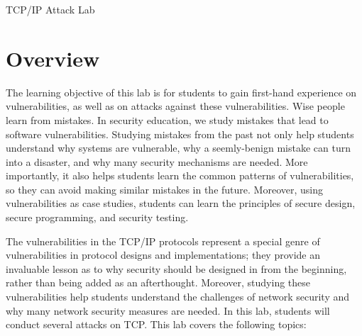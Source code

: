 




\newcommand{\telnet} {\texttt{telnet}\xspace}
\newcommand{\tcpFigs}{./Figs}




\setcounter{task}{1}
\newcommand{\mytask} {\bf {\noindent \arabic{task}} \addtocounter{task}{1} \,}



\begin{center}
{\LARGE TCP/IP Attack Lab}
\end{center}




\section{Overview}


The learning objective of this lab is for students to gain first-hand
experience on vulnerabilities, as well as on attacks against these
vulnerabilities. Wise people learn from mistakes. In security education, we
study mistakes that lead to software vulnerabilities. Studying mistakes
from the past not only help students understand why systems are vulnerable,
why a seemly-benign mistake can turn into a disaster, and why many
security mechanisms are needed. More importantly, it also helps students
learn the common patterns of vulnerabilities, so they can avoid making
similar mistakes in the future. Moreover, using vulnerabilities as case
studies, students can learn the principles of secure design, secure
programming, and security testing.

The vulnerabilities in the TCP/IP protocols represent a special genre of
vulnerabilities in protocol designs and implementations; they provide an
invaluable lesson as to why security should be designed in from the
beginning, rather than being added as an afterthought. Moreover, studying
these vulnerabilities help students understand the challenges of network
security and why many network security measures are needed.
In this lab, students will conduct several attacks on TCP.
This lab covers the following topics:

